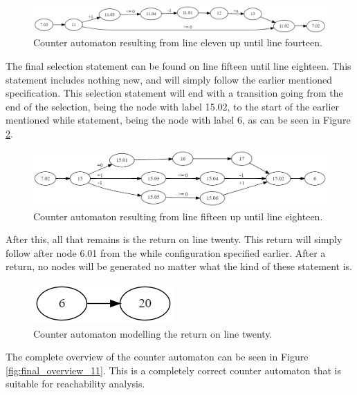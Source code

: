 \documentclass[12pt]{article}
\begin{document}
\begin{figure}[h]
	\centering
	\includegraphics[width=\linewidth]{final_overview_8}
	\caption{Counter automaton resulting from line eleven up until line fourteen.}
	\label{fig:final_overview_8}
\end{figure}

The final selection statement can be found on line fifteen until line eighteen. This statement includes nothing new, and will simply follow the earlier mentioned specification. This selection statement will end with a transition going from the end of the selection, being the node with label 15.02, to the start of the earlier mentioned while statement, being the node with label 6, as can be seen in Figure \ref{fig:final_overview_9}.

\begin{figure}[h]
	\centering
	\includegraphics[width=\linewidth]{final_overview_9}
	\caption{Counter automaton resulting from line fifteen up until line eighteen.}
	\label{fig:final_overview_9}
\end{figure}

After this, all that remains is the return on line twenty. This return will simply follow after node 6.01 from the while configuration specified earlier. After a return, no nodes will be generated no matter what the kind of these statement is.

\begin{figure}[h]
	\centering
	\includegraphics[width=0.35\linewidth]{final_overview_10}
	\caption{Counter automaton modelling the return on line twenty.}
	\label{fig:final_overview_10}
\end{figure}

The complete overview of the counter automaton can be seen in Figure \ref{fig:final_overview_11}. This is a completely correct counter automaton that is suitable for reachability analysis.
\end{document}
